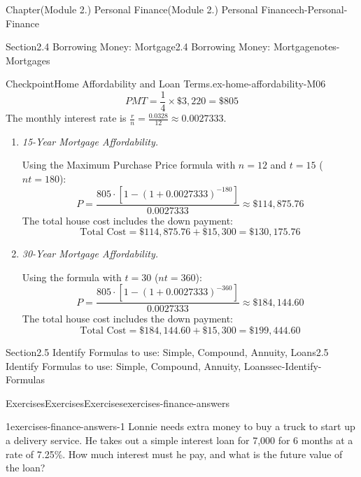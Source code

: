 \documentclass[oneside,10pt,]{book}
\newcommand{\lititle}[1]{{\slshape#1}}
\begin{document}
\begin{chapterptx}{Chapter}{(Module 2.) Personal Finance}{}{(Module 2.) Personal Finance}{}{}{ch-Personal-Finance}
\begin{sectionptx}{Section}{2.4 Borrowing Money: Mortgage}{}{2.4 Borrowing Money: Mortgage}{}{}{notes-Mortgages}
\begin{inlineexercise}{Checkpoint}{Home Affordability and Loan Terms.}{ex-home-affordability-M06}
\begin{equation*}
PMT = \frac{1}{4} \times \$3,220 = \$805
\end{equation*}
The monthly interest rate is \(\frac{r}{n}= \frac{0.0328}{12} \approx 0.0027333\).%
%
\begin{enumerate}
\item{}\lititle{15-Year Mortgage Affordability.}\par%
Using the Maximum Purchase Price formula with \(n=12\) and \(t=15\) (\(nt = 180\)):%
\begin{equation*}
P = \frac{805 \cdot [1 - (1 + 0.0027333)^{-180}]}{0.0027333} \approx \$114,875.76
\end{equation*}
The total house cost includes the down payment:%
\begin{equation*}
\text{Total Cost} = \$114,875.76 + \$15,300 = \$130,175.76
\end{equation*}
%
\item{}\lititle{30-Year Mortgage Affordability.}\par%
Using the formula with \(t=30\) (\(nt = 360\)):%
\begin{equation*}
P = \frac{805 \cdot [1 - (1 + 0.0027333)^{-360}]}{0.0027333} \approx \$184,144.60
\end{equation*}
The total house cost includes the down payment:%
\begin{equation*}
\text{Total Cost} = \$184,144.60 + \$15,300 = \$199,444.60
\end{equation*}
%
\end{enumerate}
\end{inlineexercise}%
\end{sectionptx}
%
%
\typeout{************************************************}
\typeout{************************************************}
%
\begin{sectionptx}{Section}{2.5 Identify Formulas to use: Simple, Compound, Annuity, Loans}{}{2.5 Identify Formulas to use: Simple, Compound, Annuity, Loans}{}{}{sec-Identify-Formulas}
%
%
\typeout{************************************************}
\typeout{************************************************}
%
\begin{exercises-subsection-numberless}{Exercises}{Exercises}{}{Exercises}{}{}{exercises-finance-answers}
\begin{divisionexercise}{1}{}{}{exercises-finance-answers-1}%
Lonnie needs extra money to buy a truck to start up a delivery service. He takes out a simple interest loan for \textdollar{}7,000 for 6 months at a rate of 7.25\%. How much interest must he pay, and what is the future value of the loan?%

\end{divisionexercise}
\end{exercises-subsection-numberless}
\end{sectionptx}
\end{chapterptx}
\end{document}
